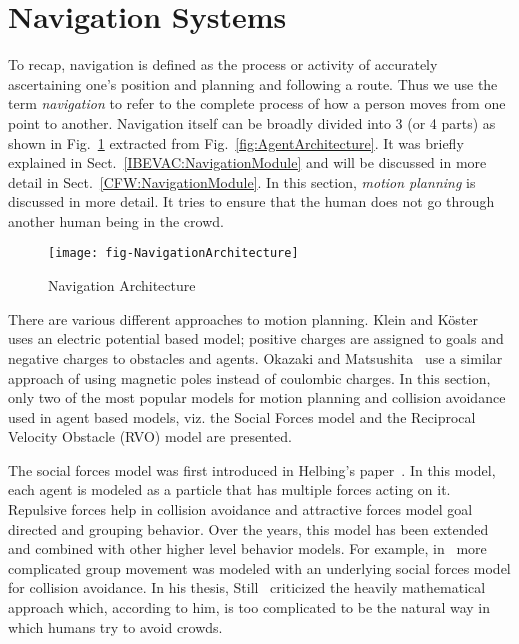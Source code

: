 \section{Navigation Systems}
\label{IBP:MotionPlanning}

To recap, navigation is defined as the process or activity of accurately ascertaining one's position and planning and following a route. Thus we use the term \emph{navigation} to refer to the complete process of how a person moves from one point to another. Navigation itself can be broadly divided into 3 (or 4 parts) as shown in Fig.~\ref{fig:NavigationArchitecture} extracted from Fig.~\ref{fig:AgentArchitecture}. It was briefly explained in Sect.~\ref{IBEVAC:NavigationModule} and will be discussed in more detail in Sect.~\ref{CFW:NavigationModule}. In this section, \emph{motion planning} is discussed in more detail. It tries to ensure that the human does not go through another human being in the crowd.

\begin{figure}[!tb]
\centering
\texttt{[image: fig-NavigationArchitecture]}
\caption{Navigation Architecture}
\label{fig:NavigationArchitecture}
\end{figure}

There are various different approaches to motion planning. Klein and K\"oster~\cite{Klein:2009} uses an electric potential based model; positive charges are assigned to goals and negative charges to obstacles and agents. Okazaki and Matsushita~\cite{Okazaki:1993wh} use a similar approach of using magnetic poles instead of coulombic charges. In this section, only two of the most popular models for motion planning and collision avoidance used in agent based models, viz. the Social Forces model and the Reciprocal Velocity Obstacle (RVO) model are presented.

The social forces model was first introduced in Helbing's paper~\cite{Helbing:1995ie}. In this model, each agent is modeled as a particle that has multiple forces acting on it. Repulsive forces help in collision avoidance and attractive forces model goal directed and grouping behavior. Over the years, this model has been extended and combined with other higher level behavior models. For example, in~\cite{Kamphuis:2004uu} more complicated group movement was modeled with an underlying social forces model for collision avoidance. In his thesis, Still~\cite{Still:2000tp} criticized the heavily mathematical approach which, according to him, is too complicated to be the natural way in which humans try to avoid crowds.

